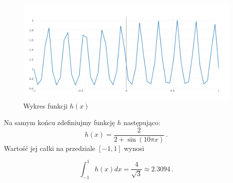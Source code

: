 \documentclass{article}
\begin{document}
    \begin{figure}
      \includegraphics[width=\linewidth]{hplot.png}
      \caption{Wykres funkcji $h(x)$}
      \label{fig:hplot}
    \end{figure}

    Na samym końcu zdefiniujmy funkcję $h$ następująco:
    \begin{equation*}
      h(x) = \frac{2}{2 + \sin(10\pi x)}\,.
    \end{equation*}
    Wartość jej całki na przedziale $[-1, 1]$ wynosi

    \begin{equation*}
      \int_{-1}^{1} h(x)dx = \frac{4}{\sqrt{3}} \approx 2.3094 \,.
    \end{equation*}
\end{document}
